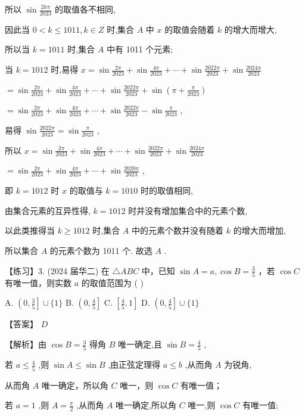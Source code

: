 \documentclass[10pt]{article}
\begin{document}
所以 \(\sin \frac{2k\pi }{2023}\) 的取值各不相同,

因此当 \(0 < k \leq  {1011},k \in  Z\) 时,集合 \(A\) 中 \(x\) 的取值会随着 \(k\) 的增大而增大,

所以当 \(k = {1011}\) 时,集合 \(A\) 中有 1011 个元素;

当 \(k = {1012}\) 时,易得 \(x = \sin \frac{2\pi }{2023} + \sin \frac{4\pi }{2023} + \cdots  + \sin \frac{2022\pi }{2023} + \sin \frac{2024\pi }{2023}\)

\(= \sin \frac{2\pi }{2023} + \sin \frac{4\pi }{2023} + \cdots  + \sin \frac{2022\pi }{2023} + \sin \left( {\pi  + \frac{\pi }{2023}}\right)\)

\(= \sin \frac{2\pi }{2023} + \sin \frac{4\pi }{2023} + \cdots  + \sin \frac{2022\pi }{2023} - \sin \frac{\pi }{2023}\) ,

易得 \(\sin \frac{2022\pi }{2023} = \sin \frac{\pi }{2023}\) ,

所以 \(x = \sin \frac{2\pi }{2023} + \sin \frac{4\pi }{2023} + \cdots  + \sin \frac{2022\pi }{2023} + \sin \frac{2024\pi }{2023}\)

\(= \sin \frac{2\pi }{2023} + \sin \frac{4\pi }{2023} + \cdots  + \sin \frac{2020\pi }{2023}\) ,

即 \(k = {1012}\) 时 \(x\) 的取值与 \(k = {1010}\) 时的取值相同,

由集合元素的互异性得, \(k = {1012}\) 时并没有增加集合中的元素个数,

以此类推得当 \(k \geq  {1012}\) 时,集合 \(A\) 中的元素个数并没有随着 \(k\) 的增大而增加,

所以集合 \(A\) 的元素个数为 1011 个. 故选 \(A\) .

【练习】3. (2024 届华二) 在 \(\bigtriangleup  {ABC}\) 中，已知 \(\sin A = a,\cos B = \frac{3}{5}\) ，若 \(\cos C\) 有唯一值，则实数 \(a\) 的取值范围为 ( )

A. \(\left( {0,\frac{3}{5}}\right\rbrack   \cup  \{ 1\}\) B. \(\left( {0,\frac{4}{5}}\right\rbrack\) C. \(\left\lbrack  {\frac{4}{5},1}\right\rbrack\) D. \(\left( {0,\frac{4}{5}}\right\rbrack   \cup  \{ 1\}\)

【答案】 \(D\)

【解析】由 \(\cos B = \frac{3}{5}\) 得角 \(B\) 唯一确定,且 \(\sin B = \frac{4}{5}\) ,

若 \(a \leq  \frac{4}{5}\) ,则 \(\sin A \leq  \sin B\) ,由正弦定理得 \(a \leq  b\) ,从而角 \(A\) 为锐角,

从而角 \(A\) 唯一确定，所以角 \(C\) 唯一，则 \(\cos C\) 有唯一值；

若 \(a = 1\) ,则 \(A = \frac{\pi }{2}\) ,从而角 \(A\) 唯一确定,所以角 \(C\) 唯一,则 \(\cos C\) 有唯一值;
\end{document}
